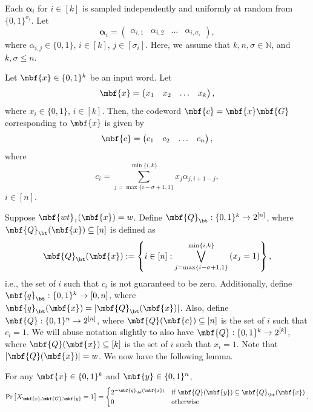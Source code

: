 Each $\boldsymbol{\alpha}_{i}$ for $i\in[k]$ is sampled independently and uniformly at random from $\{0,1\}^{\sigma_i}$. Let $$\boldsymbol{\alpha}_{i} = \left(\begin{matrix}\alpha_{i,1} & \alpha_{i,2} &\ldots&\alpha_{i, \sigma_i}\end{matrix}\right),$$where $\alpha_{i,j} \in \{0,1\}$, $i \in [k]$, $j\in [\sigma_i]$. Here, we assume that $k,n,\sigma\in\mathbb{N}$, and $k,\sigma\le n$.

Let $\mbf{x} \in \{0,1\}^k$ be an input word. Let $$\mbf{x} = \left(\begin{matrix}x_1 & x_2 &\ldots&x_{k}\end{matrix}\right),$$where $x_i \in \{0,1\}$, $i \in [k]$. Then, the codeword $\mbf{c}=\mbf{x}\mbf{G}$ corresponding to $\mbf{x}$ is given by $$\mbf{c} = \left(\begin{matrix}c_1 & c_2 &\ldots&c_{n}\end{matrix}\right),$$where$$c_i = \sum_{j = \max\{i-\sigma+1,1\}}^{\min\{i,k\}}x_j\alpha_{j,i+1-j},$$$i \in [n]$. 

Suppose $\mbf{wt}_1(\mbf{x}) = w$. Define $\mbf{Q}_{\bt}:\{0,1\}^{k} \rightarrow 2^{[n]}$, where $\mbf{Q}_{\bt}(\mbf{x}) \subseteq [n]$ is defined as$$\mbf{Q}_{\bt}(\mbf{x}) := \left\{i \in [n] : \bigvee_{j = \max\{i-\sigma+1,1\}}^{\min\{i,k\}}\left(x_{j} = 1\right) \right\},$$i.e., the set of $i$ such that $c_i$ is not guaranteed to be zero. Additionally, define $\mbf{q}_{\bt}:\{0,1\}^{k} \rightarrow [0,n]$, where $\mbf{q}_{\bt}(\mbf{x}) =|\mbf{Q}_{\bt}(\mbf{x})|$. Also, define $\mbf{Q}:\{0,1\}^{n} \rightarrow 2^{[n]}$, where $\mbf{Q}(\mbf{c}) \subseteq [n]$ is the set of $i$ such that $c_i=1$. We will abuse notation slightly to also have $\mbf{Q}:\{0,1\}^{k} \rightarrow 2^{[k]}$, where $\mbf{Q}(\mbf{x}) \subseteq [k]$ is the set of $i$ such that $x_i=1$. Note that $|\mbf{Q}(\mbf{x})| = w$. We now have the following lemma.

\begin{lemma}
For any $\mbf{x}\in \{0,1\}^k$ and $\mbf{y} \in \{0,1\}^n$,$$\Pr\left[X_{\mbf{x}, \mbf{G}, \mbf{y}}=1\right] = \begin{cases}2^{-\mbf{q}_{\bt}(\mbf{x})}&\textrm{if } \mbf{Q}(\mbf{y})\subseteq \mbf{Q}_{\bt}(\mbf{x}) \\0&\textrm{otherwise}\end{cases}.$$
\end{lemma}

